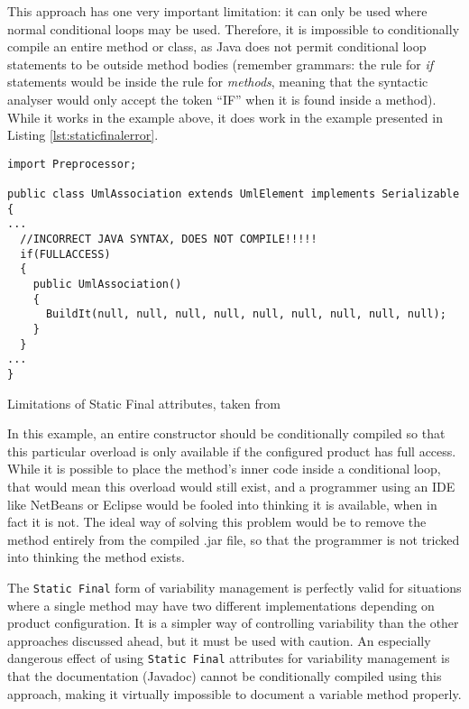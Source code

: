 This approach has one very important limitation: it can only be used where normal conditional loops may be used. Therefore, it is impossible to conditionally compile an entire method or class, as Java does not permit conditional loop statements to be outside method bodies (remember \gls{grammar}s: the rule for \emph{if} statements would be inside the rule for \emph{methods}, meaning that the syntactic analyser would only accept the token ``IF'' when it is found inside a method). While it works in the example above, it does work in the example presented in Listing \ref{lst:staticfinalerror}.

\begin{listing}
\begin{verbatim}
import Preprocessor;

public class UmlAssociation extends UmlElement implements Serializable
{
...
  //INCORRECT JAVA SYNTAX, DOES NOT COMPILE!!!!!
  if(FULLACCESS)
  {
    public UmlAssociation()
    {
      BuildIt(null, null, null, null, null, null, null, null, null);
    }
  }
...
}
\end{verbatim}
\caption{Limitations of Static Final attributes, taken from \cite{AUTOREST}} \label{lst:staticfinalerror}
\end{listing}

In this example, an entire constructor should be conditionally compiled so that this particular overload is only available if the configured product has full access. While it is possible to place the method's inner code inside a conditional loop, that would mean this overload would still exist, and a programmer using an IDE like NetBeans or Eclipse would be fooled into thinking it is available, when in fact it is not. The ideal way of solving this problem would be to remove the method entirely from the compiled .jar file, so that the programmer is not tricked into thinking the method exists.

The \lstinline{Static Final} form of \gls{variability} management is perfectly valid for situations where a single method may have two different implementations depending on product configuration. It is a simpler way of controlling \gls{variability} than the other approaches discussed ahead, but it must be used with caution. An especially dangerous effect of using \lstinline{Static Final} attributes for \gls{variability} management is that the documentation (Javadoc) cannot be conditionally compiled using this approach, making it virtually impossible to document a variable method properly.

